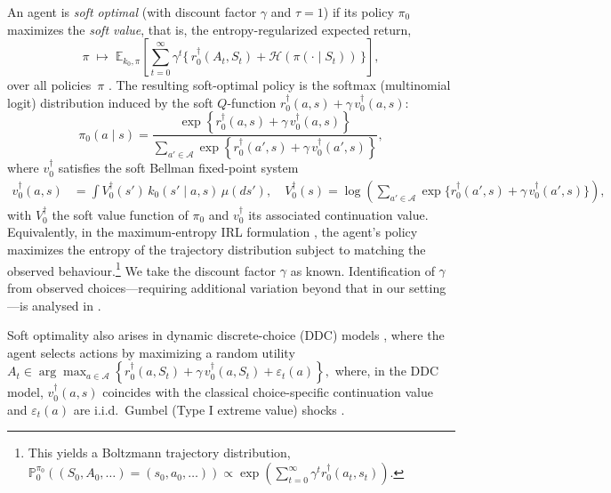 \documentclass[12pt]{article}
\theoremstyle{plain}
\begin{document}
An agent is \emph{soft optimal} (with discount factor $\gamma$ and $\tau = 1$) if its policy
$\pi_0$ maximizes the \emph{soft value}, that is, the entropy-regularized
expected return,
\[
\pi \;\mapsto\;
\mathbb{E}_{k_0,\pi}\!\left[
  \sum_{t=0}^\infty \gamma^t 
  \{\, r_0^\dagger(A_t,S_t)
    + \mathcal{H}(\pi(\cdot\mid S_t)) \,\}
\right],
\]
over all policies~$\pi$ \citep{haarnoja2017reinforcement}.  The resulting soft-optimal policy is the softmax (multinomial logit)
distribution induced by the soft $Q$-function
\(r_0^\dagger(a,s) + \gamma\, v_0^\dagger(a,s)\):
\begin{equation}
\pi_0(a \mid s)
= \frac{\exp\!\left\{ r_0^\dagger(a,s) + \gamma\, v_0^\dagger(a,s) \right\}}
       {\sum_{a' \in \mathcal{A}}
        \exp\!\left\{ r_0^\dagger(a',s) + \gamma\, v_0^\dagger(a',s) \right\}},
\label{eqn::softmaxprob}
\end{equation}
where $v_0^\dagger$ satisfies the soft Bellman fixed-point system
\begin{align*}
v_0^\dagger(a,s)
&= \int V_0^\dagger(s')\, k_0(s' \mid a,s)\,\mu(ds'), \quad
V_0^\dagger(s)
= \log\!\left(
    \sum_{a' \in \mathcal{A}}
       \exp\!\bigl\{ r_0^\dagger(a',s) + \gamma\, v_0^\dagger(a',s) \bigr\}
\right),
\end{align*}
with $V_0^\dagger$ the soft value function of $\pi_0$ and $v_0^\dagger$ its
associated continuation value. Equivalently, in the maximum-entropy IRL formulation
\citep{ziebart2008maximum,ziebart2010modeling}, the agent’s policy maximizes
the entropy of the trajectory distribution subject to matching the observed
behaviour.\footnote{This yields a Boltzmann trajectory distribution,
\(\mathbb{P}_0^{\pi_0}((S_0,A_0,\ldots)=(s_0,a_0,\ldots))
\propto
\exp(\sum_{t=0}^\infty \gamma^t r_0^\dagger(a_t,s_t))\).}  
We take the discount factor \(\gamma\) as known. Identification of \(\gamma\)
from observed choices—requiring additional variation beyond that in our
setting---is analysed in \citet{abbring2020identifying}.

Soft optimality also arises in dynamic discrete-choice (DDC) models
\citep{rust1987optimal,hotz1993conditional,aguirregabiria2010dynamic}, where
the agent selects actions by maximizing a random utility $A_t \in \arg\max_{a \in \mathcal{A}}
\left\{ r_0^\dagger(a,S_t) + \gamma\, v_0^\dagger(a,S_t) + \varepsilon_t(a) \right\},$ where, in the DDC model, $v_0^\dagger(a,s)$ coincides with the classical
choice-specific continuation value and $\varepsilon_t(a)$ are i.i.d.\ Gumbel
(Type I extreme value) shocks \citep{rust1987optimal,pitombeira2024trajectory}.
\end{document}
